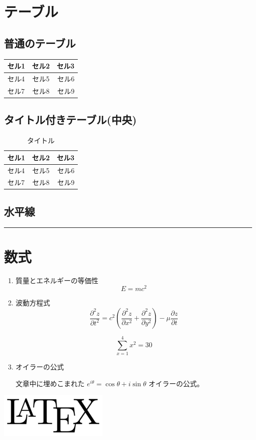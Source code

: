 \documentclass[a4paper,onecolumn,12pt]{jsarticle}
\begin{document}
\section{テーブル}
\subsection{普通のテーブル}
\begin{tabular}{|l|c|r|}
\hline
セル1 & セル2 & セル3 \\ \hline
セル4 & セル5 & セル6 \\ \hline
セル7 & セル8 & セル9 \\ \hline
\end{tabular}

\subsection{タイトル付きテーブル(中央)}

\begin{table}[htbp]
\begin{center}
\begin{tabular}{|l|c|r|}
\hline
セル1 & セル2 & セル3 \\ \hline
セル4 & セル5 & セル6 \\ \hline
セル7 & セル8 & セル9 \\ \hline
\end{tabular}
\caption{タイトル}
\end{center}
\end{table}

\subsection{水平線}
\begin{center}\rule{3in}{0.4pt}\end{center}

\clearpage
\section{数式}
\begin{enumerate}

\item 質量とエネルギーの等価性
\begin{equation}
E = mc ^2
\end{equation}

\item 波動方程式
\begin{equation}
\frac{\partial^2 z}{\partial t^2}=
c^2 (\frac{\partial^2 z}{\partial x^2}+\frac{\partial^2 z}{\partial y^2})-
\mu \frac{\partial z}{\partial t}
\end{equation}

\begin{equation}
\sum_{x=1}^4 x^2 = 30
\end{equation}

\item オイラーの公式

文章中に埋めこまれた $e^{i\theta}=\cos\theta+i\sin\theta$ オイラーの公式。

\end{enumerate}

\includegraphics{latex.png}
\end{document}

